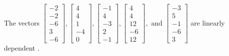 \begin{exercise}
\begin{exerciseStatement}
  \end{exerciseStatement}
  \begin{exerciseAnswer}
   The vectors \(\left[\begin{array}{r}
-2 \\
-2 \\
-6 \\
3 \\
-6
\end{array}\right] , \left[\begin{array}{r}
4 \\
4 \\
1 \\
-4 \\
0
\end{array}\right] , \left[\begin{array}{r}
-1 \\
4 \\
-3 \\
2 \\
-1
\end{array}\right] , \left[\begin{array}{r}
4 \\
4 \\
12 \\
-6 \\
12
\end{array}\right] , \text{ and } \left[\begin{array}{r}
-3 \\
5 \\
-1 \\
-6 \\
3
\end{array}\right]\) are 
  	 linearly dependent  .
  


  \end{exerciseAnswer}
\end{exercise}
